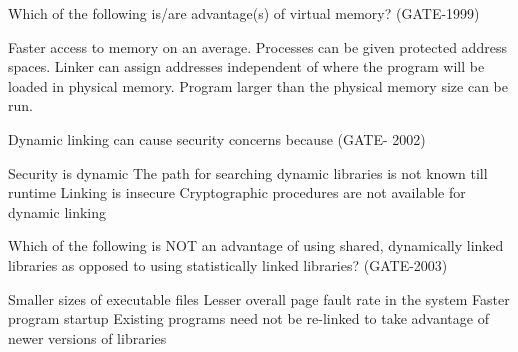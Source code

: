 
\begin{questyle}

  \question  Which of the following is/are advantage(s) of virtual memory? (GATE-1999)

  \begin{choices}
    \choice Faster access to memory on an average.
    \choice Processes can be given protected address spaces.
    \choice Linker can assign addresses independent of where the program will be loaded in physical memory.
    \choice Program larger than the physical memory size can be run.
  \end{choices}

\end{questyle}


\begin{questyle}

  \question  Dynamic linking can cause security concerns because (GATE- 2002)

  \begin{choices}
    \choice Security is dynamic
    \choice The path for searching dynamic libraries is not known till runtime
    \choice Linking is insecure
    \choice Cryptographic procedures are not available for dynamic linking
  \end{choices}

\end{questyle}


\begin{questyle}

  \question  Which of the following is NOT an advantage of using shared, dynamically linked libraries as opposed to
              using statistically linked libraries? (GATE-2003)

  \begin{choices}
    \choice Smaller sizes of executable files
    \choice Lesser overall page fault rate in the system
    \choice Faster program startup
    \choice Existing programs need not be re-linked to take advantage of newer versions of libraries
  \end{choices}

\end{questyle}

